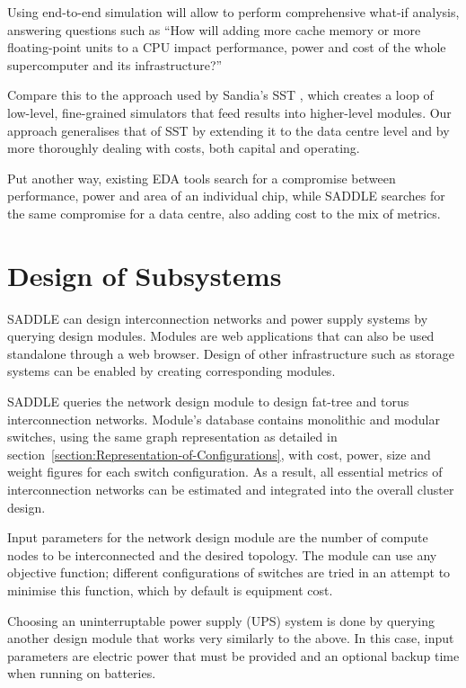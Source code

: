 \documentclass[runningheads,a4paper]{llncs}
\begin{document}
Using end-to-end simulation will allow to perform comprehensive what-if analysis, answering questions such as ``How will adding more cache memory or more floating-point units to a CPU impact performance, power and cost of the whole supercomputer and its infrastructure?''

Compare this to the approach used by Sandia's SST \cite{hendry2012sst}, which creates a loop of low-level, fine-grained simulators that feed results into higher-level modules. Our approach generalises that of SST by extending it to the data centre level and by more thoroughly dealing with costs, both capital and operating.

Put another way, existing EDA tools search for a compromise between performance, power and area of an individual chip, while SADDLE searches for the same compromise for a data centre, also adding cost to the mix of metrics.


\section{Design of Subsystems}

SADDLE can design interconnection networks and power supply systems by querying design modules. Modules are web applications that can also be used standalone through a web browser. Design of other infrastructure such as storage systems can be enabled by creating corresponding modules.

SADDLE queries the network design module to design fat-tree and torus interconnection networks. Module's database contains monolithic and modular switches, using the same graph representation as detailed in section~\ref{section:Representation-of-Configurations}, with cost, power, size and weight figures for each switch configuration. As a result, all essential metrics of interconnection networks can be estimated and integrated into the overall cluster design.

Input parameters for the network design module are the number of compute nodes to be interconnected and the desired topology. The module can use any objective function; different configurations of switches are tried in an attempt to minimise this function, which by default is equipment cost.

Choosing an uninterruptable power supply (UPS) system is done by querying another design module that works very similarly to the above. In this case, input parameters are electric power that must be provided and an optional backup time when running on batteries.
\end{document}
